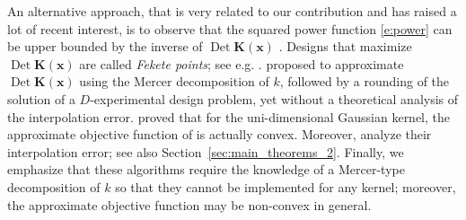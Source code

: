 \documentclass[twoside,11pt]{book}
\DeclareMathOperator{\Det}{Det}
\DeclareMathOperator{\X}{\mathcal{X}}
\newcommand{\pc}[1]{\textcolor{blue}{#1}}
\newcommand{\rb}[1]{\textcolor{magenta}{#1}}
\begin{document}



An alternative approach, that is very related to our contribution and has raised a lot of recent interest, is to observe that the squared power function \eqref{e:power} can be upper bounded by the inverse of $\Det \bm{K}(\bm{x})$ \citep{Sch05,Tan19}.
 Designs that maximize $\Det \bm{K}(\bm{x})$ are called \emph{Fekete points}; see e.g. \citep{BoMa02,BoDe11}.
\cite{Tan19} proposed to approximate $\Det \bm{K}(\bm{x})$ using the Mercer decomposition of $k$, followed by a rounding of the solution of a $D$-experimental design problem, yet without a theoretical analysis of the interpolation error.
\cite{KaSaTa19} proved that for the uni-dimensional Gaussian kernel, the approximate objective function of \citep{Tan19} is actually convex. Moreover, \cite{KaSaTa19} analyze their interpolation error; see also Section~\ref{sec:main_theorems_2}.
Finally, we emphasize that these algorithms require the knowledge of a Mercer-type decomposition of $k$ so that they cannot be implemented for any kernel; moreover, the approximate objective function may be non-convex in general.
\end{document}

